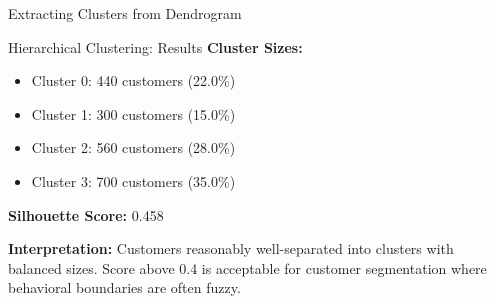 \documentclass[aspectratio=169,ignorenonframetext]{beamer}
\begin{document}
\begin{frame}{Extracting Clusters from Dendrogram}
\begin{Shaded}
\begin{Highlighting}[]

\OperatorTok{=} 
\OperatorTok{=}
\NormalTok{    linkage\_matrices[}\NormalTok{],}
\OperatorTok{=}
\NormalTok{)}

\OperatorTok{=}
\NormalTok{)}
\end{Highlighting}
\end{Shaded}
\end{frame}

\begin{frame}{Hierarchical Clustering: Results}
\textbf{Cluster Sizes:}

\begin{itemize}
\item
  Cluster 0: 440 customers (22.0\%)
\item
  Cluster 1: 300 customers (15.0\%)
\item
  Cluster 2: 560 customers (28.0\%)
\item
  Cluster 3: 700 customers (35.0\%)
\end{itemize}

\textbf{Silhouette Score:} 0.458

\textbf{Interpretation:} Customers reasonably well-separated into
clusters with balanced sizes. Score above 0.4 is acceptable for customer
segmentation where behavioral boundaries are often fuzzy.
\end{frame}
\end{document}
